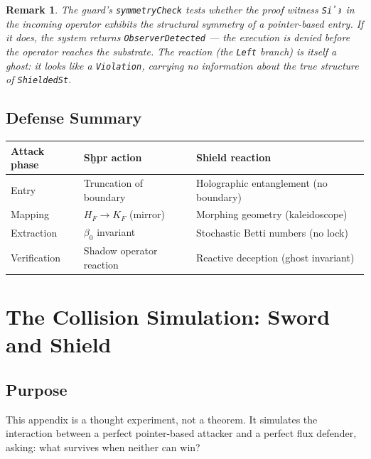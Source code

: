 \documentclass[11pt,letterpaper]{article}
\newtheorem{remark}[theorem]{Remark}
\begin{document}
\begin{remark}
The guard's \texttt{symmetryCheck} tests whether the proof witness
\texttt{Sỉꜣ} in the incoming operator exhibits the structural symmetry
of a pointer-based entry.  If it does, the system returns
\texttt{ObserverDetected} --- the execution is denied before the operator
reaches the substrate.  The \emph{reaction} (the \texttt{Left} branch)
is itself a ghost: it looks like a \texttt{Violation}, carrying no
information about the true structure of \texttt{ShieldedSt}.
\end{remark}

\subsection{Defense Summary}

\begin{center}
\renewcommand{\arraystretch}{1.3}
\begin{tabular}{lll}
\toprule
Attack phase & Sḫpr action & Shield reaction \\
\midrule
Entry & Truncation of boundary & Holographic entanglement (no boundary) \\
Mapping & $H_F \to K_F$ (mirror) & Morphing geometry (kaleidoscope) \\
Extraction & $\beta_0$ invariant & Stochastic Betti numbers (no lock) \\
Verification & Shadow operator reaction & Reactive deception (ghost invariant) \\
\bottomrule
\end{tabular}
\end{center}

\section{The Collision Simulation: Sword and Shield}
\label{app:collision}

\subsection*{Purpose}

This appendix is a thought experiment, not a theorem.  It simulates the
interaction between a perfect pointer-based attacker and a perfect flux
defender, asking: what survives when neither can win?
\end{document}
